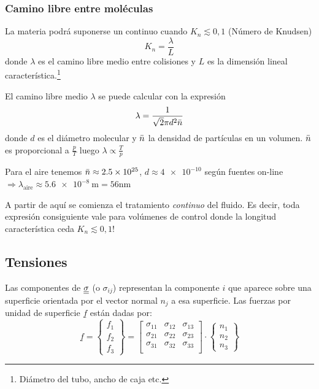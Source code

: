 \subsubsection*{Camino libre entre moléculas}
La materia podrá suponerse un continuo cuando $K_n\lesssim 0,1$ (Número de Knudsen)
\[
K_n = \frac{\lambda}{L}
\]
donde $\lambda$ es el camino libre medio entre colisiones y $L$ es la dimensión lineal característica.\footnote{Diámetro del tubo, ancho de caja etc.}

El camino libre medio $\lambda$ se puede calcular con la expresión
\[
\lambda = \frac{1}{\sqrt{2} \pi d^2 \bar{n}}
\]
donde $d$ es el diámetro molecular y $\bar{n}$ la densidad de partículas en un volumen. $\bar{n}$ es proporcional a $\frac{p}{T}$ luego $\lambda \propto \frac{T}{p}$

Para el aire tenemos $\bar{n} \approx \num{2,5e25}$, $d\approx \num{4e-10}$ según fuentes on-line $\Rightarrow \lambda_{\textrm{aire}} \approx \SI{5,6e-8}{\meter}=56\si{\nano \meter}$
\begin{mdframed}
A partir de aquí se comienza el tratamiento \textit{continuo} del fluido. Es decir, toda expresión consiguiente vale para volúmenes de control donde la longitud característica ceda $K_n \lesssim 0,1$!
\end{mdframed}

\subsection{Tensiones}
Las componentes de $\underline{\underline{\sigma}}$ (o $\sigma_{ij}$) representan la componente $i$ que aparece sobre una superficie orientada por el vector normal $n_j$ a esa superficie. Las fuerzas por unidad de superficie $\underline{f}$ están dadas por:
\[
\underline{f}=
\begin{Bmatrix}
f_1 \\
f_2 \\
f_3
\end{Bmatrix} =
\begin{bmatrix}
\sigma_{11} & \sigma_{12} & \sigma_{13} \\
\sigma_{21} & \sigma_{22} & \sigma_{23} \\
\sigma_{31} & \sigma_{32} & \sigma_{33} \\
\end{bmatrix} \cdot
\begin{Bmatrix}
n_1 \\
n_2 \\
n_3
\end{Bmatrix}
\]

